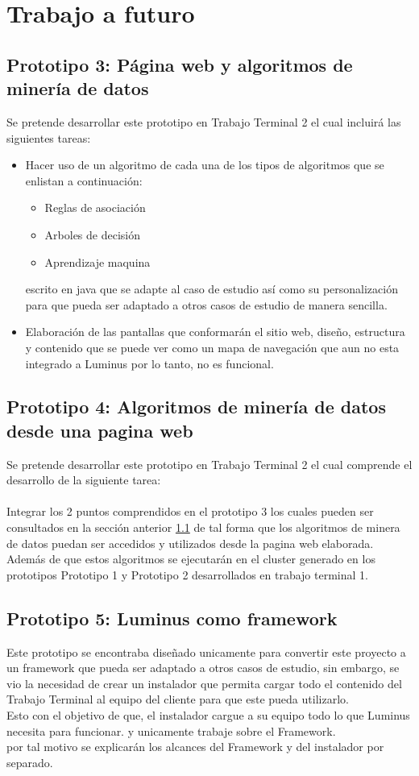 \section{Trabajo a futuro}
\subsection{Prototipo 3: Página web y algoritmos de minería de datos}
\label{proto3}
Se pretende desarrollar este prototipo en Trabajo Terminal 2 el cual incluirá las siguientes tareas:
\begin{itemize}
	\item Hacer uso de un algoritmo de cada una de los tipos de algoritmos que se enlistan a continuación:
	\begin{itemize}
		\item Reglas de asociación
		\item Arboles de decisión
		\item Aprendizaje maquina
	\end{itemize}
	 escrito en java que se adapte al caso de estudio así como su personalización para que pueda ser adaptado a otros casos de estudio de manera sencilla.
	\item Elaboración de las pantallas que conformarán el sitio web, diseño, estructura y contenido que se puede ver como un mapa de navegación que aun no esta integrado a Luminus por lo tanto, no es funcional.  
\end{itemize}
\subsection{Prototipo 4: Algoritmos de minería de datos desde una pagina web}
Se pretende desarrollar este prototipo en Trabajo Terminal 2 el cual comprende el desarrollo de la siguiente tarea:
\\ 
\\ 
Integrar los 2 puntos comprendidos en el prototipo 3 los cuales pueden ser consultados en la sección anterior \ref{proto3} de tal forma que los algoritmos de minera de datos puedan ser accedidos y utilizados desde la pagina web elaborada. 
\\
Además de que estos algoritmos se ejecutarán en el cluster generado en los prototipos Prototipo 1  y Prototipo 2  desarrollados en trabajo terminal 1.
\subsection{Prototipo 5: Luminus como framework}
Este prototipo se encontraba diseñado unicamente para convertir este proyecto a un framework que pueda ser adaptado a otros casos de estudio, sin embargo, se vio la necesidad de crear un instalador que permita cargar todo el contenido del Trabajo Terminal al equipo del cliente para que este pueda utilizarlo.\\
Esto con el objetivo de que, el instalador cargue a su equipo todo lo que Luminus necesita para funcionar. y unicamente trabaje sobre el Framework. \\
por tal motivo se explicarán los alcances del Framework y del instalador por separado.

